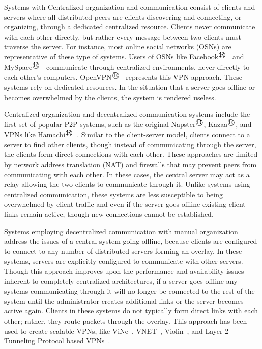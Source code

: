 Systems with Centralized organization and communication consist of clients and
servers where all distributed peers are clients discovering and connecting, or
organizing, through a dedicated centralized resource. Clients never communicate
with each other directly, but rather every message between two clients must
traverse the server.  For instance, most online social networks (OSNs) are
representative of these type of systems.  Users of OSNs like
Facebook$^\registered$~\cite{facebook} and MySpace$^\registered$~\cite{myspace} communicate through
centralized environments, never directly to each other's computers.
OpenVPN$^\registered$~\cite{openvpn} represents this VPN approach.  These systems rely on
dedicated resources.  In the situation that a server goes offline or becomes
overwhelmed by the clients, the system is rendered useless.

Centralized organization and decentralized communication systems include the
first set of popular P2P systems, such as the original Napster$^\registered$, Kazaa$^\registered$, and VPNs
like Hamachi$^\registered$~\cite{hamachi}.  Similar to the client-server model, clients
connect to a server to find other clients, though instead of communicating
through the server, the clients form direct connections with each other.  These
approaches are limited by network address translation (NAT) and firewalls that
may prevent peers from communicating with each other.  In these cases, the
central server may act as a relay allowing the two clients to communicate
through it.  Unlike systems using centralized communication, these systems are
less susceptible to being overwhelmed by client traffic and even if the server
goes offline existing client links remain active, though new connections cannot
be established.

Systems employing decentralized communication with manual organization address
the issues of a central system going offline, because clients are configured to
connect to any number of distributed servers forming an overlay.  In these
systems, servers are explicitly configured to communicate with other servers.
Though this approach improves upon the performance and availability issues
inherent to completely centralized architectures, if a server goes offline any
systems communicating through it will no longer be connected to the rest of the
system until the administrator creates additional links or the server becomes
active again.  Clients in these systems do not typically form direct links with
each other; rather, they route packets through the overlay.  This approach has
been used to create scalable VPNs, like ViNe~\cite{vine}, VNET~\cite{vnet},
Violin~\cite{violin}, and Layer 2 Tunneling Protocol based VPNs~\cite{l2tp}.

